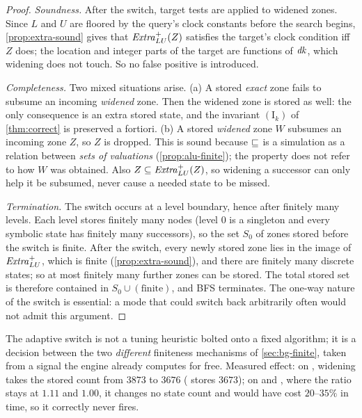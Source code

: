 \begin{proof}
\emph{Soundness.}  After the switch, target tests are applied to widened zones.
Since $L$ and $U$ are floored by the query's clock constants before the search
begins, \cref{prop:extra-sound} gives that $\mathit{Extra}^{+}_{LU}(Z)$ satisfies the target's
clock condition iff $Z$ does; the location and integer parts of the target are
functions of $\mathit{dk}$, which widening does not touch.  So no false positive is
introduced.

\emph{Completeness.}  Two mixed situations arise.  (a) A stored \emph{exact}
zone fails to subsume an incoming \emph{widened} zone.  Then the widened zone is
stored as well: the only consequence is an extra stored state, and the
invariant $(\mathrm{I}_k)$ of \cref{thm:correct} is preserved a fortiori.  (b) A
stored \emph{widened} zone $W$ subsumes an incoming zone $Z$, so $Z$ is dropped.
This is sound because $\sqsubseteq$ is a simulation as a relation between \emph{sets
of valuations} (\cref{prop:alu-finite}); the property does not refer to how $W$
was obtained.  Also $Z \subseteq \mathit{Extra}^{+}_{LU}(Z)$, so widening a successor can only
help it be subsumed, never cause a needed state to be missed.

\emph{Termination.}  The switch occurs at a level boundary, hence after finitely
many levels.  Each level stores finitely many nodes (level $0$ is a singleton
and every symbolic state has finitely many successors), so the set $S_0$ of
zones stored before the switch is finite.  After the switch, every newly stored
zone lies in the image of $\mathit{Extra}^{+}_{LU}$, which is finite
(\cref{prop:extra-sound}), and there are finitely many discrete states; so at
most finitely many further zones can be stored.  The total stored set is
therefore contained in $S_0 \cup (\text{finite})$, and BFS terminates.  The
one-way nature of the switch is essential: a mode that could switch back
arbitrarily often would not admit this argument.
\end{proof}

\begin{remark}
The adaptive switch is not a tuning heuristic bolted onto a fixed algorithm; it
is a decision between the two \emph{different} finiteness mechanisms of
\cref{sec:bg-finite}, taken from a signal the engine already computes for free.
Measured effect: on , widening takes the stored count from $3873$
to $3676$ (\uppaal{} stores $3673$); on  and , where the
ratio stays at $1.11$ and $1.00$, it changes no state count and would have cost
$20$--$35\%$ in time, so it correctly never fires.
\end{remark}

